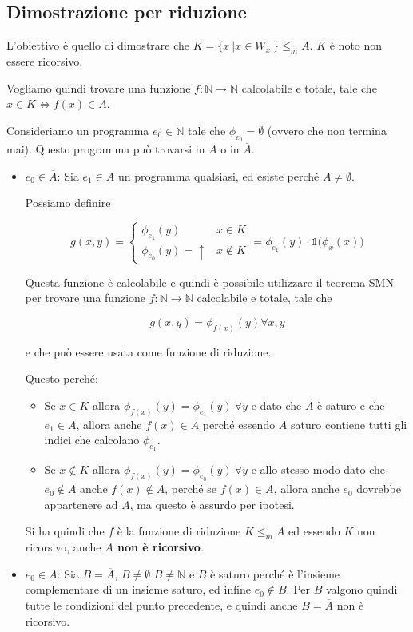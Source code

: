 \subsection{Dimostrazione per riduzione}

L'obiettivo è quello di dimostrare che $K = \{ x \: | x \in W_x\: \} \leq_m A$. $K$ è noto non essere ricorsivo.

Vogliamo quindi trovare una funzione $f : \mathbb{N} \rightarrow \mathbb{N}$ calcolabile e totale, tale che $x \in K \Leftrightarrow f(x) \in A$.

Consideriamo un programma $e_0 \in \mathbb{N}$ tale che $\phi_{e_0} = \emptyset$ (ovvero che non termina mai). Questo programma può trovarsi in $A$ o in $\overline{A}$.

\begin{itemize}
	\item $e_0 \in \overline{A}$: Sia $e_1 \in A$ un programma qualsiasi, ed esiste perché $A \neq \emptyset$.
	
	Possiamo definire
	
	$$
	g(x,y) = \begin{cases}
	\phi_{e_1}(y) &x \in K \\
	\phi_{e_0}(y) = \uparrow & x \notin K
	\end{cases} = \phi_{e_1}(y) \cdot \mathbb{1} \big( \phi_x(x) \big)
	$$ 
	
	Questa funzione è calcolabile e quindi è possibile utilizzare il teorema SMN per trovare una funzione $f : \mathbb{N} \rightarrow \mathbb{N}$ calcolabile e totale, tale che 
	
	$$
	g(x,y) = \phi_{f(x)}(y) \forall x,y
	$$
	
	e che può essere usata come funzione di riduzione.
	
	Questo perché:
	\begin{itemize}
		\item Se $x	\in K$ allora $\phi_{f(x)}(y) = \phi_{e_1}(y) \: \forall y$ e dato che $A$ è saturo e che $e_1 \in A$, allora anche $f(x) \in A$ perché essendo $A$ saturo contiene tutti gli indici che calcolano $\phi_{e_1} $.
		\item Se $x \notin K$ allora $\phi_{f(x)}(y) = \phi_{e_0}(y) \: \forall y$ e allo stesso modo dato che $e_0 \notin A$ anche $f(x) \notin A$, perché se $f(x) \in A$, allora anche $e_0$ dovrebbe appartenere ad $A$, ma questo è assurdo per ipotesi.
	\end{itemize}
	
	Si ha quindi che $f$ è la funzione di riduzione $K \leq_m A$ ed essendo $K$ non ricorsivo, anche \textbf{$A$ non è ricorsivo}.
	
	\item $e_0 \in A$: Sia $B = \overline{A}$, $B \neq \emptyset$ $B \neq \mathbb{N}$ e $B$ è saturo perché è l'insieme complementare di un insieme saturo, ed infine $e_0 \notin B$. Per $B$ valgono quindi tutte le condizioni del punto precedente, e quindi anche $B = \overline{A}$ non è ricorsivo.
\end{itemize} 


